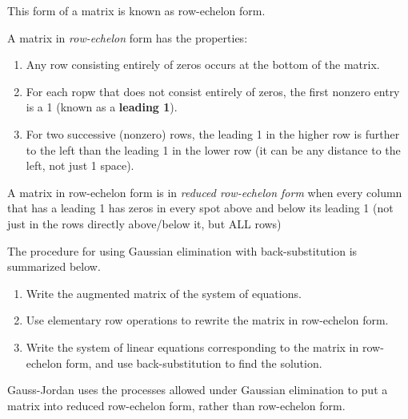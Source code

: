 This form of a matrix is known as row-echelon form.
\begin{definition}\label{def:2}
	A matrix in \emph{row-echelon} form has the properties:
	\begin{enumerate}
		\item Any row consisting entirely of zeros occurs at the bottom of the matrix.
		\item For each ropw that does not consist entirely of zeros, the first nonzero entry is a 1 (known as a \textbf{leading 1}).
		\item For two successive (nonzero) rows, the leading 1 in the higher row is further to the left than the leading 1 in the lower row (it can be any distance to the left, not just 1 space).
	\end{enumerate}
	A matrix in row-echelon form is in \emph{reduced row-echelon form} when every column that has a leading 1 has zeros in every spot above and below its leading 1 (not just in the rows directly above/below it, but ALL rows)
\end{definition}
\begin{remark}
	The procedure for using Gaussian elimination with back-substitution is summarized below.
	\begin{enumerate}
		\item Write the augmented matrix of the system of equations.
		\item Use elementary row operations to rewrite the matrix in row-echelon form.
		\item Write the system of linear equations corresponding to the matrix in row-echelon form, and use back-substitution to find the solution.
	\end{enumerate}
\end{remark}
\begin{remark}
	Gauss-Jordan uses the processes allowed under Gaussian elimination to put a matrix into reduced row-echelon form, rather than row-echelon form.
\end{remark}
